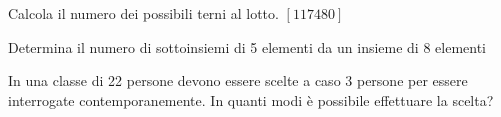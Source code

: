 \begin{esercizio}
\label{ese:C.2}
Calcola il numero dei possibili terni al lotto.
\hfill \(\left[117480\right]\)
\end{esercizio}

\begin{esercizio}
\label{ese:C.3}
Determina il numero di sottoinsiemi di 5 elementi da un insieme di 8 elementi
\end{esercizio}

\begin{esercizio}
\label{ese:C.4}
In una classe di 22 persone devono essere scelte a caso 3 persone per essere interrogate contemporanemente. In quanti modi è possibile effettuare la scelta?
\end{esercizio}


\begin{comment}
\subsection{Esercizi riepilogativi}

\begin{esercizio}
\label{ese:R.1}
Quante sono le diagonali di un ottagono?
\end{esercizio}

\begin{esercizio}
\label{ese:R.2}
In un torneo di calcio a otto squadre, ogni squadra deve giocare una partita contro ognuna delle altre. Quante partite si giocheranno?
\end{esercizio}
\end{comment}
